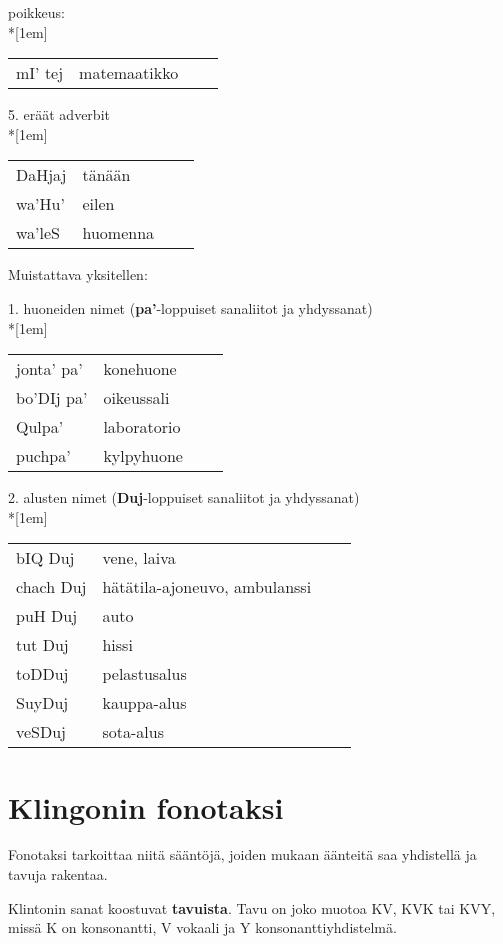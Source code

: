 \documentclass{book}
\begin{document}
poikkeus:\\*[1em]
\begin{tabular}{Bl Il}
    mI' tej & matemaatikko \\
\end{tabular}

5. eräät adverbit\\*[1em]
\begin{tabular}{Bl Il}
    DaHjaj  & tänään \\
    wa'Hu' & eilen \\
    wa'leS & huomenna \\
\end{tabular}

Muistattava yksitellen:

1. huoneiden nimet (\textbf{pa'}-loppuiset sanaliitot ja yhdyssanat)\\*[1em]
\begin{tabular}{Bl Il}
    jonta' pa' & konehuone \\
    bo'DIj pa' & oikeussali \\
    Qulpa' & laboratorio \\
    puchpa' & kylpyhuone \\
\end{tabular}

2. alusten nimet (\textbf{Duj}-loppuiset sanaliitot ja yhdyssanat)\\*[1em]
\begin{tabular}{Bl Il}
    bIQ Duj & vene, laiva \\
    chach Duj & hätätila-ajoneuvo, ambulanssi \\
    puH Duj & auto \\
    tut Duj & hissi \\
    toDDuj & pelastusalus \\
    SuyDuj & kauppa-alus \\
    veSDuj & sota-alus \\
\end{tabular}

\chapter{Klingonin fonotaksi}
\label{apx:fonotaksi}

Fonotaksi tarkoittaa niitä sääntöjä, joiden mukaan äänteitä saa yhdistellä ja tavuja rakentaa.

Klintonin sanat koostuvat \textbf{tavuista}.
Tavu on joko muotoa KV, KVK tai KVY, missä K on konsonantti, V vokaali ja Y konsonanttiyhdistelmä.
\end{document}
